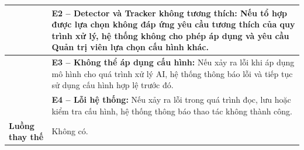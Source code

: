 \begin{longtable}{|>{\raggedright\arraybackslash}p{2.9cm}|p{12.3cm}|}
 & \textbf{E2 -- Detector và Tracker không tương thích:} Nếu tổ hợp được lựa chọn không đáp ứng yêu cầu tương thích của quy trình xử lý, hệ thống không cho phép áp dụng và yêu cầu Quản trị viên lựa chọn cấu hình khác. \\ \cline{2-2}
 & \textbf{E3 -- Không thể áp dụng cấu hình:} Nếu xảy ra lỗi khi áp dụng mô hình cho quá trình xử lý AI, hệ thống thông báo lỗi và tiếp tục sử dụng cấu hình hợp lệ trước đó. \\ \cline{2-2}
 & \textbf{E4 -- Lỗi hệ thống:} Nếu xảy ra lỗi trong quá trình đọc, lưu hoặc kiểm tra cấu hình, hệ thống thông báo thao tác không thành công. \\ \hline
\textbf{Luồng thay thế} & Không có. \\ \hline
\end{longtable}

